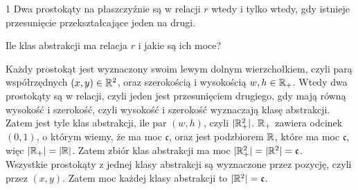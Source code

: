 \documentclass{../note}
\begin{document}
\begin{zadanie}{1}
Dwa prostokąty na płaszczyźnie są w relacji $r$ wtedy i tylko wtedy, gdy istnieje przesunięcie przekształcające jeden na drugi.

Ile klas abstrakcji ma relacja $r$ i jakie są ich moce?
\end{zadanie}
\begin{rozwiazanie}
Każdy prostokąt jest wyznaczony swoim lewym dolnym wierzchołkiem, czyli parą współrzędnych $(x, y) \in \mathbb{R}^2$, oraz szerokością i wysokością $w, h \in \mathbb{R}_+$. Wtedy dwa prostokąty są w relacji, czyli jeden jest przesunięciem drugiego, gdy mają równą wysokość i szerokość, czyli wysokość i szerokość wyznaczają klasę abstrakcji. Zatem jest tyle klas abstrakcji, ile par $(w, h)$, czyli $|\mathbb{R}_+^2|$. $\mathbb{R}_+$ zawiera odcinek $(0, 1)$, o którym wiemy, że ma moc $\mathfrak{c}$, oraz jest podzbiorem $\mathbb{R}$, które ma moc $\mathfrak{c}$, więc $|\mathbb{R}_+| = |\mathbb{R}|$. Zatem zbiór klas abstrakcji ma moc $|\mathbb{R}_+^2| = |\mathbb{R}^2| = \mathfrak{c}$.\\
Wszystkie prostokąty z jednej klasy abstrakcji są wyznaczone przez pozycję, czyli przez $(x, y)$. Zatem moc każdej klasy abstrakcji to $|\mathbb{R}^2| = \mathfrak{c}$.
\end{rozwiazanie}
\end{document}
